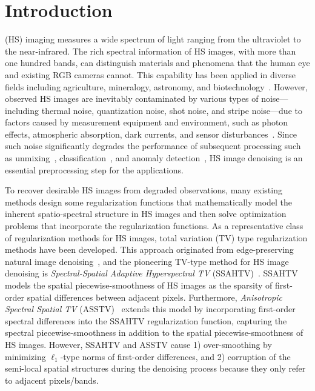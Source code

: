 \documentclass[10pt,journal]{IEEEtran}
\begin{document}
\section{Introduction}
 (HS) imaging measures a wide spectrum of light ranging from the ultraviolet to the near-infrared.
The rich spectral information of HS images, with more than one hundred bands, can distinguish materials and phenomena that the human eye and existing RGB cameras cannot.
This capability has been applied in diverse fields including agriculture, mineralogy, astronomy, and biotechnology~\cite{Borengasser2007HSIApplications,Grahn2007Techniques, Thenkabail2016VegetationOverview,Lu2020AgricultureOverview}.
However, observed HS images are inevitably contaminated by various types of noise---including thermal noise, quantization noise, shot noise, and stripe noise---due to factors caused by measurement equipment and environment, such as photon effects, atmospheric absorption, dark currents, and sensor disturbances~\cite{Shen2015DenoisingOverview,Rasti2018DenoisingOverview,Shen2022DenoisingOverview}.
Since such noise significantly degrades the performance of subsequent processing such as unmixing~\cite{Bioucas-Dias2012UnmixingOverview,Ma2014UnmixingOverview}, classification~\cite{Ghamisi2017Classification,Li2019Classification,Nicolas2019Classification}, and anomaly detection~\cite{Matteoli2014Anomaly,Su2022Anomaly}, HS image denoising is an essential preprocessing step for the applications.


To recover desirable HS images from degraded observations, many existing methods design some regularization functions that mathematically model the inherent spatio-spectral structure in HS images and then solve optimization problems that incorporate the regularization functions.
As a representative class of regularization methods for HS images, total variation (TV) type regularization methods have been developed.
This approach originated from edge-preserving natural image denoising~\cite{Rudin1992TV,Bresson2008TV}, and the pioneering TV-type method for HS image denoising is \textit{Spectral-Spatial Adaptive Hyperspectral TV} (SSAHTV)~\cite{Yuan2012HTV}.
SSAHTV models the spatial piecewise-smoothness of HS images as the sparsity of first-order spatial differences between adjacent pixels.
Furthermore, \textit{Anisotropic Spectral Spatial TV} (ASSTV)~\cite{Chang2015ASSTV} extends this model by incorporating first-order spectral differences into the SSAHTV regularization function, capturing the spectral piecewise-smoothness in addition to the spatial piecewise-smoothness of HS images.
However, SSAHTV and ASSTV cause 1) over-smoothing by minimizing $\ell_{1}$-type norms of first-order differences, and 2) corruption of the semi-local spatial structures during the denoising process because they only refer to adjacent pixels/bands.
\end{document}
